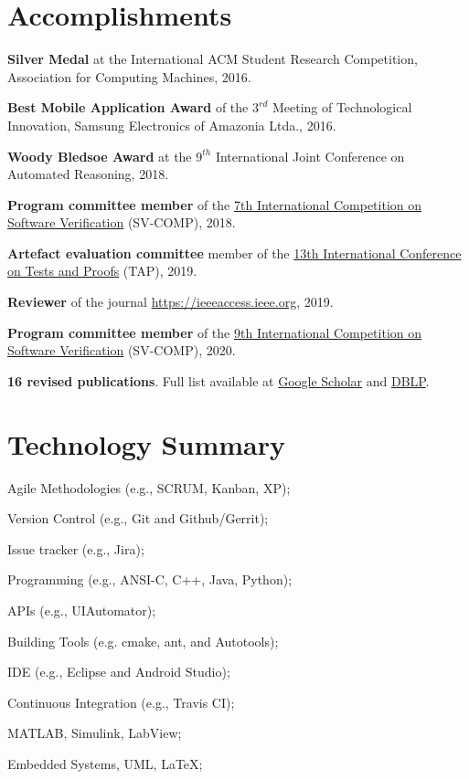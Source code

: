 \documentclass[letterpaper]{article}
\renewenvironment{itemize}{
  \begin{list}{}{
    \setlength{\leftmargin}{1.5em}
  }
}{
  \end{list}
}
\begin{document}
\section*{Accomplishments}
\begin{itemize}
  \item {\bf Silver Medal} at the International ACM Student Research Competition, Association for Computing Machines, 2016.

  \item {\bf Best Mobile Application Award} of the $3^{rd}$ Meeting of Technological Innovation, Samsung Electronics of Amazonia Ltda., 2016.
  
  \item {\bf Woody Bledsoe Award} at the $9^{th}$ International Joint Conference on Automated Reasoning, 2018.
  
  \item {\bf Program committee member} of the \href{https://sv-comp.sosy-lab.org/2018/committee.php}{7th International Competition on Software Verification} (SV-COMP), 2018.
  
  \item {\bf Artefact evaluation committee} member of the \href{https://tap.sosy-lab.org/2019/committee.php}{13th International Conference on Tests and Proofs} (TAP), 2019.
  
  \item {\bf Reviewer} of the journal \href{IEEE Access}{https://ieeeaccess.ieee.org}, 2019.
  
  \item {\bf Program committee member} of the \href{https://sv-comp.sosy-lab.org/2020/committee.php}{9th International Competition on Software Verification} (SV-COMP), 2020.

  \item {\bf 16 revised publications}. Full list available at \href{https://scholar.google.com/citations?hl=en&user=6bNQcz0AAAAJ}{Google Scholar} and \href{https://dblp.uni-trier.de/pers/hd/m/Monteiro:Felipe_R=}{DBLP}.
\end{itemize}

\section*{Technology Summary}
   \begin{itemize}
   \item{Agile Methodologies (e.g., SCRUM, Kanban, XP);}
   \item{Version Control (e.g., Git and Github/Gerrit);}
   \item{Issue tracker (e.g., Jira);}
   \item{Programming (e.g., ANSI-C, C++, Java, Python);}
   \item{APIs (e.g., UIAutomator);}
   \item{Building Tools (e.g. cmake, ant, and Autotools);}
   \item{IDE (e.g., Eclipse and Android Studio);}
   \item{Continuous Integration (e.g., Travis CI);}
   \item{MATLAB, Simulink, LabView;}
   \item{Embedded Systems, UML, \LaTeX;}
   \end{itemize}
   
\end{document}
